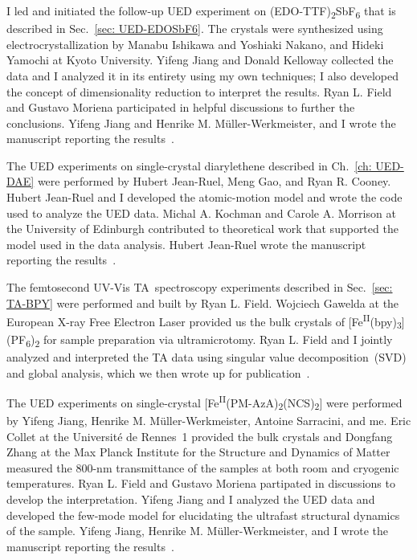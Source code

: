 I led and initiated the follow-up UED experiment on (EDO-TTF)\textsubscript{2}SbF\textsubscript{6} that is
described in Sec.~\ref{sec: UED-EDOSbF6}. The crystals were synthesized using electrocrystallization
by Manabu Ishikawa and Yoshiaki Nakano, and Hideki Yamochi at Kyoto University.
Yifeng Jiang and Donald Kelloway collected the data and I analyzed it
in its entirety using my own techniques;
I also developed the concept of dimensionality reduction to interpret the results.
Ryan L. Field and Gustavo Moriena participated in helpful discussions to further the conclusions.
Yifeng Jiang and Henrike M. M\"{u}ller-Werkmeister, and I wrote
the manuscript reporting the results~\cite{Liu2017}.

The UED experiments on single-crystal diarylethene described in Ch.~\ref{ch: UED-DAE}
were performed by Hubert Jean-Ruel, Meng Gao, and Ryan R. Cooney. Hubert Jean-Ruel
and I developed the atomic-motion model and wrote the code used to analyze the UED data.
Michal A. Kochman and Carole A. Morrison at the University of Edinburgh
contributed to theoretical work that supported the model used in the data analysis.
Hubert Jean-Ruel wrote the manuscript reporting the results~\cite{Jean-Ruel2013}.

The femtosecond UV-Vis TA~spectroscopy experiments described
in Sec.~\ref{sec: TA-BPY} were performed and built by Ryan L. Field.
Wojciech Gawelda at the European X-ray Free Electron Laser provided us
the bulk crystals of [Fe\textsuperscript{II}(bpy)\textsubscript{3}](PF\textsubscript{6})\textsubscript{2}
for sample preparation via ultramicrotomy.
Ryan L. Field and I jointly analyzed and interpreted the TA data
using singular value decomposition~(SVD) and global analysis, which we then wrote up
for publication~\cite{Field2016}.

The UED experiments on single-crystal
[Fe\textsuperscript{II}(PM-AzA)\textsubscript{2}(NCS)\textsubscript{2}]
were performed by Yifeng Jiang, Henrike M. M\"{u}ller-Werkmeister,
Antoine Sarracini, and me.
Eric Collet at the Universit\'{e} de Rennes~1 provided the bulk crystals and
Dongfang Zhang at the Max Planck Institute for the Structure and Dynamics of Matter measured
the 800-nm transmittance of the samples at both room and cryogenic temperatures. Ryan L. Field and
Gustavo Moriena partipated in discussions to develop the interpretation. Yifeng Jiang and I analyzed
the UED data and developed the few-mode model for elucidating the ultrafast structural dynamics
of the sample. Yifeng Jiang, Henrike M. M\"{u}ller-Werkmeister,
and I wrote the manuscript reporting the results~\cite{Jiang2017}.


